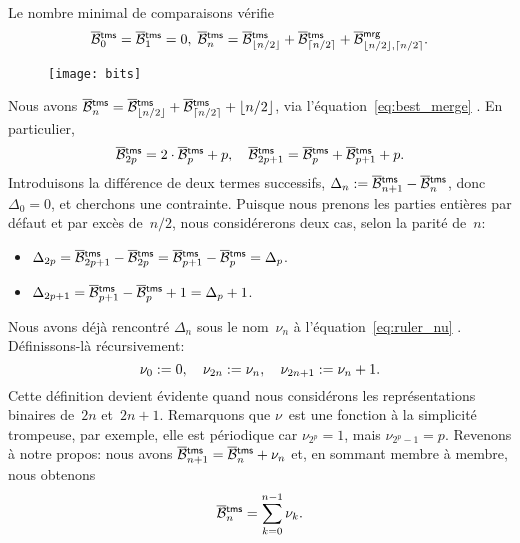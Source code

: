 Le nombre minimal de comparaisons vérifie
\begin{equation*}
\OB{\fun{tms}}{0} = \OB{\fun{tms}}{1} = 0,
\;
\OB{\fun{tms}}{n} = \OB{\fun{tms}}{\floor{n/2}}
+ \OB{\fun{tms}}{\ceiling{n/2}}
+ \OB{\fun{mrg}}{\floor{n/2},\ceiling{n/2}}.
\index{mrg@\fun{mrg/2}}
\index{tms@$\OB{\fun{tms}}{n}$}
\end{equation*}
%
{\setlength{\intextsep}{0pt} %
\begin{wrapfigure}[23]{r}[0pt]{0pt}
\centering
\texttt{[image: bits]}
\caption{}
\label{fig:bits}
\end{wrapfigure}
Nous avons \(\OB{\fun{tms}}{n} = \OB{\fun{tms}}{\floor{n/2}} +
\OB{\fun{tms}}{\ceiling{n/2}} +
\floor{n/2}\), via
l'équation~\eqref{eq:best_merge} .
En particulier,
\begin{equation*}
\OB{\fun{tms}}{2p} = 2 \cdot \OB{\fun{tms}}{p} + p,\quad
\OB{\fun{tms}}{2p+1} = \OB{\fun{tms}}{p} + \OB{\fun{tms}}{p+1} + p.
\end{equation*}
Introduisons la différence de deux termes successifs, \(\Delta_n :=
\OB{\fun{tms}}{n+1} - \OB{\fun{tms}}{n}\), donc \(\Delta_0 = 0\), et
cherchons une contrainte. Puisque nous prenons les parties entières
par défaut et par excès de~\(n/2\), nous considérerons deux cas, selon
la parité de~\(n\):
\begin{itemize}

 \item \(\Delta_{2p} = \OB{\fun{tms}}{2p+1} - \OB{\fun{tms}}{2p} =
  \OB{\fun{tms}}{p+1} - \OB{\fun{tms}}{p} = \Delta_{p}\).

  \item \(\Delta_{2p+1} = \OB{\fun{tms}}{p+1} - \OB{\fun{tms}}{p} + 1 =
  \Delta_{p} + 1\).

\end{itemize}
Nous avons déjà rencontré \(\Delta_n\) sous le nom~\(\nu_n\) à
l'équation~\eqref{eq:ruler_nu} . Définissons-là
récursivement:
\begin{equation}
\nu_{0} := 0,\quad \nu_{2n} := \nu_{n},\quad
\nu_{2n+1} := \nu_{n} + 1.\label{def:nu}\index{somme des bits}
\end{equation}
Cette définition devient évidente quand nous considérons les
représentations binaires de~\(2n\) et~\(2n+1\). Remarquons que
\(\nu\)~est une fonction à la simplicité trompeuse, par exemple, elle
est périodique car \(\nu_{2^p} = 1\), mais
\(\nu_{2^p-1}=p\). Revenons à notre propos: nous avons
\(\OB{\fun{tms}}{n+1} = \OB{\fun{tms}}{n} + \nu_n\) et, en sommant
membre à membre, nous obtenons
\begin{equation}
\abovedisplayskip=6pt
\abovedisplayshortskip=6pt
\belowdisplayskip=2pt
\OB{\fun{tms}}{n} = \sum_{k=0}^{n-1}{\nu_k}.\label{eq:OB_tms}
\index{tms@$\OB{\fun{tms}}{n}$}
\end{equation}}

